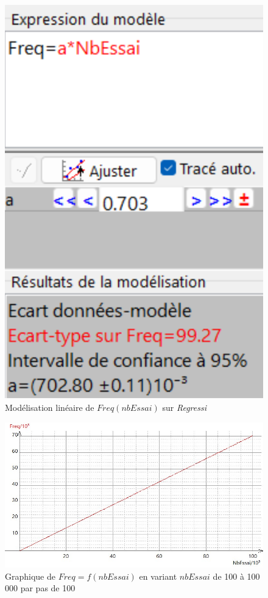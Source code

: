 \documentclass{report}
\begin{document}
\begin{figure}[H]
	\centering
	\includegraphics[scale=0.5]{../graphe/valDePE3C.png}
	\caption{Modélisation linéaire de $Freq(nbEssai)$ sur \textit{Regressi}}
\end{figure}

\begin{figure}[H]
	\includegraphics[width=\textwidth]{../graphe/FreqE3C(n).jpg}
	\caption{Graphique de $Freq=f(nbEssai)$ en variant $nbEssai$ de 100 à 100 000 par pas de 100}
\end{figure}	
\end{document}
